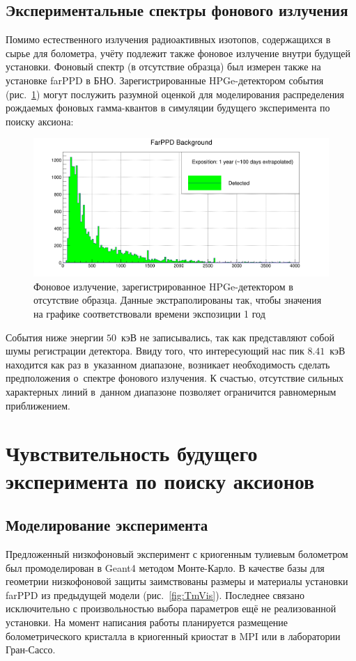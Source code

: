 \documentclass[a4paper,article,14pt]{extarticle}
\begin{document}
\subsection{Экспериментальные спектры фонового излучения}
Помимо естественного излучения радиоактивных изотопов, содержащихся в сырье для болометра, учёту подлежит также фоновое излучение внутри будущей установки.
Фоновый спектр (в отсутствие образца) был измерен также на установке farPPD в БНО.
Зарегистрированные HPGe-детектором события (рис.~\ref{fig:fon}) могут послужить разумной оценкой для моделирования распределения рождаемых фоновых гамма-квантов в симуляции будущего эксперимента по поиску аксиона:
\begin{figure}[h]
    \centering
    \includegraphics[width = \textwidth]{images/FarPPD_background.png}
    \caption{Фоновое излучение, зарегистрированное HPGe-детектором в отсутствие образца. Данные экстраполированы так, чтобы значения на графике соответствовали времени экспозиции 1 год}
    \label{fig:fon}
\end{figure}

События ниже энергии $50$~кэВ не записывались, так как представляют собой шумы регистрации детектора.
Ввиду того, что интересующий нас пик $8.41$~кэВ находится как раз в~указанном диапазоне, возникает необходимость сделать предположения о~спектре фонового излучения.
К счастью, отсутствие сильных характерных линий в~данном диапазоне позволяет ограничится равномерным приближением.


\pagebreak
\newpage
\section{Чувствительность будущего эксперимента по поиску аксионов}
\subsection{Моделирование эксперимента}
Предложенный низкофоновый эксперимент с криогенным тулиевым болометром был промоделирован в Geant4 методом Монте-Карло.
В качестве базы для геометрии низкофоновой защиты заимствованы размеры и материалы установки farPPD из предыдущей модели (рис.~\ref{fig:TmVis}).
Последнее связано исключительно с произвольностью выбора параметров ещё не реализованной установки.
На момент написания работы планируется размещение болометрического кристалла в криогенный криостат в MPI или в лаборатории Гран-Сассо.
\end{document}

